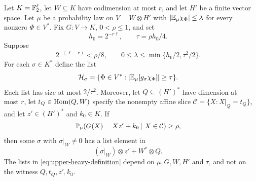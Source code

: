 \begin{lemma}
\label{lem:heavy-list}
Let $K=\mathbb F_2^\ell$, let $W\subseteq K$ have codimension at most $r$, and
let $H'$ be a finite vector space.  Let $\mu$ be a probability law on
$V=W\otimes H'$ with $|\mathbb E_\mu\chi_\Phi|\le\lambda$ for every nonzero
$\Phi\in V^*$.  Fix $G:V\longrightarrow K$, $0<\rho\le1$, and set
\[
 h_0=2^{-r\ell},\qquad \tau=\rho h_0/4.
\]
Suppose
\begin{equation}\label{eq:upper-Fourier-conditions}
 2^{-(\ell-r)}<\rho/8,
 \qquad 0\le\lambda\le\min\{h_0/2,\tau^2/2\}.
\end{equation}
For each $\sigma\in K^*$ define the list
\begin{equation}\label{eq:upper-heavy-definition}
 \mathcal H_\sigma
 =\{\Phi\in V^*:|\mathbb E_\mu[g_\sigma\chi_\Phi]|\ge\tau\}.
\end{equation}
Each list has size at most $2/\tau^2$.  Moreover, let
$Q\subseteq(H')^*$ have dimension at most $r$, let
$t_Q\in\operatorname{Hom}(Q,W)$ specify the nonempty affine slice
$\mathcal C=\{X:X|_Q=t_Q\}$, and let
$z'\in(H')^*$ and $k_0\in K$.  If
\begin{equation}\label{eq:upper-slice-equality}
 \mathbb P_\mu(G(X)=Xz'+k_0\mid X\in\mathcal C)\ge\rho,
\end{equation}
then some $\sigma$ with $\sigma|_W\ne0$ has a list element in
\begin{equation}\label{eq:upper-heavy-coset}
 (\sigma|_W)\otimes z'+W^*\otimes Q.
\end{equation}
The lists in \eqref{eq:upper-heavy-definition} depend on $\mu,G,W,H'$ and
$\tau$, and not on the witness $Q,t_Q,z',k_0$.
\end{lemma}

